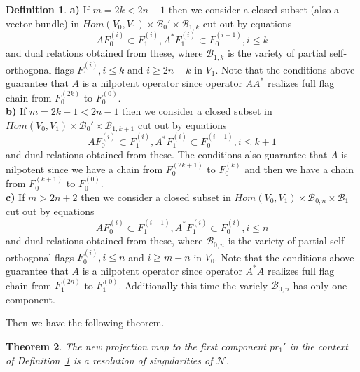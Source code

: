 \documentclass[12pt]{amsart}
\newtheorem{thm}{Theorem}[subsection]
\theoremstyle{definition}
\newtheorem{defn}[thm]{Definition}
\theoremstyle{remark}
\numberwithin{equation}{subsection}
\begin{document}
    \begin{defn}
  \label{defn2}
    \textbf{a)} If $m=2k<2n-1$ then we consider a closed subset (also a vector bundle) in $Hom(V_0,V_1)\times \mathcal{B}_0' \times \mathcal{B}_{1,k}$ cut out by equations
    \begin{equation}
        AF_{0}^{(i)} \subset F_1^{(i)}, A^* F_1^{(i)}\subset F_0^{(i-1)}, i\le k
    \end{equation}
    and dual relations obtained from these, where $\mathcal{B}_{1,k}$ is the variety of partial self-orthogonal flags $F_1^{(i)}, i\le k$ and $i\ge 2n-k$ in $V_1$. Note that the conditions above guarantee that $A$ is a nilpotent operator since operator $AA^*$ realizes full flag chain from $F_0^{(2k)}$ to $F_0^{(0)}$.\\
    
    \textbf{b)} If $m=2k+1<2n-1$ then we consider a closed subset in $Hom(V_0,V_1)\times \mathcal{B}_0' \times \mathcal{B}_{1,k+1}$ cut out by equations
    \begin{equation}
        AF_{0}^{(i)} \subset F_1^{(i)}, A^* F_1^{(i)}\subset F_0^{(i-1)}, i\le k+1
    \end{equation}
    and dual relations obtained from these. The conditions also guarantee that $A$ is nilpotent since we have a chain from $F_0^{(2k+1)}$ to $F_0^{(k)}$ and then we have a chain from $F_0^{(k+1)}$ to $F_0^{(0)}$.\\
    
    \textbf{c)} If $m> 2n+2$ then we consider a closed subset in $Hom(V_0,V_1)\times \mathcal{B}_{0,n} \times \mathcal{B}_{1}$ cut out by equations
    \begin{equation}
        AF_{0}^{(i)} \subset F_1^{(i-1)}, A^* F_1^{(i)}\subset F_0^{(i)}, i\le n
    \end{equation}
    and dual relations obtained from these, where $\mathcal{B}_{0,n}$ is the variety of partial self-orthogonal flags $F_0^{(i)}, i\le n$ and $i\ge m-n$ in $V_0$. Note that the conditions above guarantee that $A$ is a nilpotent operator since operator $A^*A$ realizes full flag chain from $F_1^{(2n)}$ to $F_1^{(0)}$. Additionally this time the variely $\mathcal{B}_{0,n}$ has only one component.
\end{defn}
    Then we have the following theorem.
    \begin{thm}
  \label{thm2}
  The new projection map to the first component  $pr_1'$ in the context of Definition~\ref{defn2} is a resolution of singularities of $\mathcal{N}$.
  \end{thm}
\end{document}
